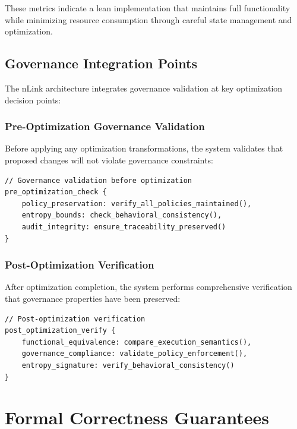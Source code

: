 These metrics indicate a lean implementation that maintains full functionality while minimizing resource consumption through careful state management and optimization.

\subsection{Governance Integration Points}

The nLink architecture integrates governance validation at key optimization decision points:

\subsubsection{Pre-Optimization Governance Validation}

Before applying any optimization transformations, the system validates that proposed changes will not violate governance constraints:

\begin{lstlisting}[style=riftlang, language=rift]
// Governance validation before optimization
pre_optimization_check {
    policy_preservation: verify_all_policies_maintained(),
    entropy_bounds: check_behavioral_consistency(),
    audit_integrity: ensure_traceability_preserved()
}
\end{lstlisting}

\subsubsection{Post-Optimization Verification}

After optimization completion, the system performs comprehensive verification that governance properties have been preserved:

\begin{lstlisting}[style=riftlang, language=rift]
// Post-optimization verification
post_optimization_verify {
    functional_equivalence: compare_execution_semantics(),
    governance_compliance: validate_policy_enforcement(),
    entropy_signature: verify_behavioral_consistency()
}
\end{lstlisting}

\section{Formal Correctness Guarantees}

